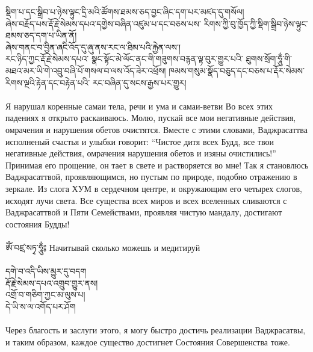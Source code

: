 སྡིག་པ་དང་སྒྲིབ་པ་ཉེས་ལྟུང་དྲི་མའི་ཚོགས་ཐམས་ཅད་བྱང་ཞིང་དག་པར་མཛད་དུ་གསོལ། \\
ཞེས་བརྗོད་པས་རྡོ་རྗེ་སེམས་དཔའ་དགྱེས་བཞིན་འཛུམ་པ་དང་བཅས་པས་ རིགས་ཀྱི་བུ་ཁྱོད་ཀྱི་སྡིག་སྒྲིབ་ཉེས་ལྟུང་ཐམས་ཅད་དག་པ་ཡིན་ནོ། \\
ཞེས་གནང་བ་བྱིན་ཞངི་འོད་དུ་ཞུ་ནས་རང་ལ་ཐིམ་པའི་རྐྱེན་ལས་། \\
རང་ཉིད་ཀྱང་རྡོ་རྗེ་སེམས་དཔའ་ སྣང་སྟོང་མེ་ལོང་ནང་གི་གཟུགས་བརྙན་ལྟ་བུར་གྱུར་པའི་ ཐུགས་སྲོག་ཧཱུྂ་གི་མཐའ་མར་ཡི་གེ་འབྲུ་བཞི་པོ་གསལ་བ་ལས་འོད་ཟེར་འཕྲོས། ཁམས་གསུམ་སྣོད་བཅུད་དང་བཅས་པ་རྡོར་སེམས་རིགས་ལྔའི་རྟེན་དང་བརྟེན་པའི་ རང་བཞིན་དུ་སངས་རྒྱས་པར་གྱུར།\\
\\
\ru
Я нарушал коренные самаи тела, речи и ума и самаи-ветви
Во всех этих падениях я открыто раскаиваюсь.
Молю, пускай все мои негативные действия, омрачения и нарушения обетов очистятся.
Вместе с этими словами, Ваджрасаттва исполненый счастья и улыбки говорит:
“Чистое дитя всех Будд, все твои негативные действия, омрачения
нарушения обетов и изяны очистились!”
Принимая его прощение, он тает в свете и раство\-ряется во мне!
Так я становлюсь Ваджрасаттвой,
проявляющи\-мся, но пустым по природе, подобно отражению в зеркале.
Из слога ХУМ в сердечном центре, и окружающим его четырех слогов, исходят лучи света.
Все существа всех миров и всех вселенных
сливаются с Ваджрасаттвой и Пяти Семействами, проявляя чистую мандалу,
достигают состояния Будды!\\
\\
\ti
ཨོཾ་བཛྲ་སཏྭ་ཧཱུྂ༔ \ru Начитывай сколько можешь и медитируй\\
\\
\ti
དགེ་བ་འདི་ཡིས་མྱུར་དུ་བདག \\
རྡོ་རྗེ་སེམས་དཔའ་འགྲུབ་གྱུར་ནས། \\
འགྲོ་བ་གཅིག་ཀྱང་མ་ལུས་པ། \\
དེ་ཡི་ས་ལ་འགོད་པར་ཤོག\\
\\
\ru
Через благость и заслуги этого, я могу быстро достичь реализации Ваджрасатвы,
и таким образом, каждое существо достигнет Состояния Совершенства тоже.
